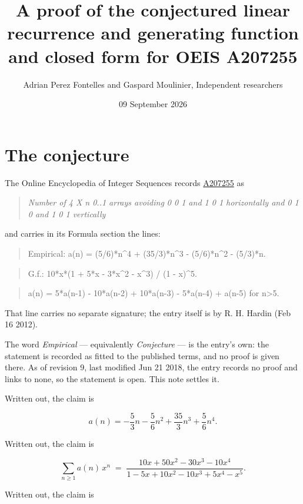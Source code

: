 \documentclass[11pt]{article}
\title{A proof of the conjectured linear recurrence and generating function and closed form for OEIS A207255}
\author{Adrian Perez Fontelles and Gaspard Moulinier, Independent researchers}
\date{09 September 2026}
\theoremstyle{definition}
\begin{document}
\maketitle
\section{The conjecture}

The Online Encyclopedia of Integer Sequences records \href{https://oeis.org/A207255}{A207255} as

\begin{quote}\itshape Number of 4 X n 0..1 arrays avoiding 0 0 1 and 1 0 1 horizontally and 0 1 0 and 1 0 1 vertically\end{quote}

and carries in its Formula section the lines:

\begin{quote}\ttfamily Empirical: a(n) = (5/6)*n\textasciicircum{}4 + (35/3)*n\textasciicircum{}3 - (5/6)*n\textasciicircum{}2 - (5/3)*n.\end{quote}

\begin{quote}\ttfamily G.f.: 10*x*(1 + 5*x - 3*x\textasciicircum{}2 - x\textasciicircum{}3) / (1 - x)\textasciicircum{}5.\end{quote}

\begin{quote}\ttfamily a(n) = 5*a(n-1) - 10*a(n-2) + 10*a(n-3) - 5*a(n-4) + a(n-5) for n>5.\end{quote}

That line carries no separate signature; the entry itself is by R. H. Hardin (Feb 16 2012).

The word {\itshape Empirical} --- equivalently {\itshape Conjecture} --- is the entry's own: the statement is recorded as fitted to the published terms, and no proof is given there. As of revision 9, last modified Jun 21 2018, the entry records no proof and links to none, so the statement is open. This note settles it.

Written out, the claim is

\[a(n) = -\frac{5}{3}n - \frac{5}{6}n^{2} + \frac{35}{3}n^{3} + \frac{5}{6}n^{4}.\]

Written out, the claim is

\[\sum_{n \ge 1} a(n)\,x^n \;=\; \frac{10x + 50x^{2} - 30x^{3} - 10x^{4}}{1 - 5x + 10x^{2} - 10x^{3} + 5x^{4} - x^{5}}.\]

Written out, the claim is
\end{document}
